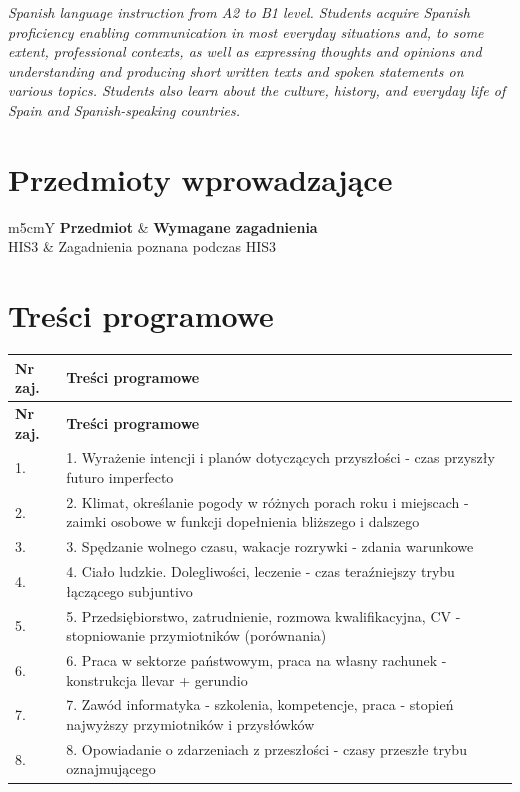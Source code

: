 \documentclass[12pt, a4paper]{article}
\newcommand{\thdrule}{\noalign{\global\setlength{\extrarowheight}{0pt}}}
\newcommand{\thdend}{\noalign{\global\setlength{\extrarowheight}{3pt}}}
\begin{document}
\textit{Spanish language instruction from A2 to B1 level. Students acquire Spanish proficiency enabling communication in most everyday situations and, to some extent, professional contexts, as well as expressing thoughts and opinions and understanding and producing short written texts and spoken statements on various topics. Students also learn about the culture, history, and everyday life of Spain and Spanish-speaking countries.}


\section{Przedmioty wprowadzające}

{\scriptsize
\begin{tabularx}{\textwidth}{m{5cm}Y}
\thdrule\toprule
{} {\color{white}\textbf{Przedmiot}} & {\color{white}\textbf{Wymagane zagadnienia}} \\
\midrule\thdend
   HIS3 & Zagadnienia poznana podczas HIS3 \\
\bottomrule
\end{tabularx}}

\section{Treści programowe}

{\scriptsize
\begin{longtable}{m{1.5cm}m{14.5cm}}
\thdrule\toprule
\rowcolor{pjatkRed} {\color{white}\textbf{Nr zaj.}} & {\color{white}\textbf{Treści programowe}} \\
\midrule\thdend
\endfirsthead
\thdrule\toprule
\rowcolor{pjatkRed} {\color{white}\textbf{Nr zaj.}} & {\color{white}\textbf{Treści programowe}} \\
\midrule\thdend
\endhead
  \rowcolor{tableRowLight} 1. & 1. Wyrażenie intencji i planów dotyczących przyszłości - czas przyszły futuro imperfecto \\
  \rowcolor{tableRowAlt} 2. & 2. Klimat, określanie pogody w różnych porach roku i miejscach - zaimki osobowe w funkcji dopełnienia bliższego i dalszego \\
  \rowcolor{tableRowLight} 3. & 3. Spędzanie wolnego czasu, wakacje rozrywki - zdania warunkowe \\
  \rowcolor{tableRowAlt} 4. & 4. Ciało ludzkie. Dolegliwości, leczenie - czas teraźniejszy trybu łączącego subjuntivo \\
  \rowcolor{tableRowLight} 5. & 5. Przedsiębiorstwo, zatrudnienie, rozmowa kwalifikacyjna, CV - stopniowanie przymiotników (porównania) \\
  \rowcolor{tableRowAlt} 6. & 6. Praca w sektorze państwowym, praca na własny rachunek - konstrukcja llevar + gerundio \\
  \rowcolor{tableRowLight} 7. & 7. Zawód informatyka - szkolenia, kompetencje, praca - stopień najwyższy przymiotników i przysłówków \\
  \rowcolor{tableRowAlt} 8. & 8. Opowiadanie o zdarzeniach z przeszłości - czasy przeszłe trybu oznajmującego \\
\bottomrule
\end{longtable}}
\end{document}
